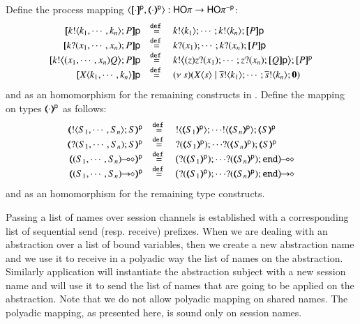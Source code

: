 \begin{definition}\rm
	Define the process mapping $\encod{\cdot}{\cdot}{\mathsf{p}}: \HOp \to \HOp^{-\mathsf{p}}$:
\[
	\begin{array}{rcl}
		\map{\bout{k}{k_1, \cdots, k_n} P}{\mathsf{p}}
		&\defeq&
		\bout{k}{k_1} \cdots ;  \bout{k}{k_n} \map{P}{\mathsf{p}}
		\\

		\map{\binp{k}{x_1, \cdots, x_n} P}{\mathsf{p}}
		&\defeq&
		\binp{k}{x_1} \cdots ; \binp{k}{x_n}  \map{P}{\mathsf{p}}
		\\

		\map{\bbout{k}{\abs{x_1, \cdots, x_n} Q} P}{\mathsf{p}}
		&\defeq&
		\bbout{k}{\abs{z}\binp{z}{x_1} \cdots ; \binp{z}{x_n} \map{Q}{\mathsf{p}}} \map{P}^{\mathsf{p}}
		\\

		\map{\appl{X}{k_1, \cdots, k_n}}{\mathsf{p}}
		&\defeq&
		\newsp{s}{\appl{X}{s} \Par \bout{\dual{s}}{k_1} \cdots ; \bout{\dual{s}}{k_n} \inact} 
	\end{array}
	\]
	and as an homomorphism for the remaining constructs in \HOp. 
	Define the mapping on types $(\!\!\langle\cdot\rangle\!\!)^\mathsf{p}$ as follows:
\[
	\begin{array}{rcl}
		\tmap{\btout{S_1, \cdots, S_n}S}{\mathsf{p}}
		&\defeq&
		\btout{\tmap{S_1}{\mathsf{p}}} \cdots \btout{\tmap{S_n}{\mathsf{p}}}\tmap{S}{\mathsf{p}}
		\\
		\tmap{\btinp{S_1, \cdots, S_n}S}{\mathsf{p}}
		&\defeq&
		\btinp{\tmap{S_1}{\mathsf{p}}} \cdots \btinp{\tmap{S_n}{\mathsf{p}}}\tmap{S}{\mathsf{p}}
		\\
		\tmap{\lhot{(S_1, \cdots, S_n)}}{\mathsf{p}}
		&\defeq&
		\lhot{\big(\btinp{\tmap{S_1}{\mathsf{p}}} \cdots \btinp{\tmap{S_n}{\mathsf{p}}}\tinact\big)}
		\\
		\tmap{\shot{(S_1, \cdots, S_n)}}{\mathsf{p}}
		&\defeq&
		\shot{\big(\btinp{\tmap{S_1}{\mathsf{p}}} \cdots \btinp{\tmap{S_n}{\mathsf{p}}}\tinact\big)}
	\end{array}
\]
	and as an homomorphism for the remaining type constructs.
\end{definition}
%
Passing a list of names over session channels is established
with a corresponding list of sequential send (resp. receive) prefixes.
When we are dealing with an abstraction over a list of bound variables,
then we create a new abstraction name and we use it to receive in a polyadic
way the list of names on the abstraction. Similarly application will instantiate
the abstraction subject with a new session name and will use it 
to send the list of names that are going to be applied on the abstraction.
Note that we do not allow polyadic mapping on shared names.
The polyadic mapping, as presented here, is sound only on session names.

